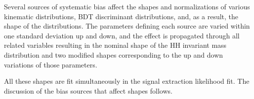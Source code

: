 Several sources of systematic bias affect the shapes and normalizations of various
kinematic distributions, BDT discriminant distributions, and, as a
result, the shape of the \mTHH distributions. The parameters defining
each source are varied within one standard deviation up and down, and
the effect is propagated through all related variables resulting in
the nominal shape of the HH invariant mass distribution and two
modified shapes corresponding to the up and down variations of those
parameters.  %

All these shapes are fit simultaneously in the
signal extraction likelihood fit. The discussion of the bias sources
that affect shapes follows.

